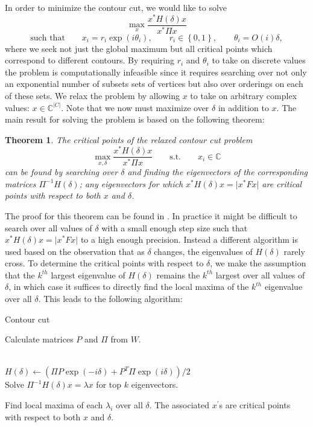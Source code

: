 \documentclass{SMBV12}
\newtheorem{theorem}{Theorem}[section]
\begin{document}
In order to minimize the contour cut, we would like to solve
\begin{equation}
\max_x \dfrac{x^*H(\delta)x}{x^* \Pi x} 
\end{equation}
\begin{equation*}
 \mbox{such that} \qquad x_i = r_i\exp(i\theta_i), \qquad r_i \in \left\lbrace 0, 1 \right\rbrace, \qquad \theta_i = O(i)\delta,
\end{equation*}
where we seek not just the global maximum but all critical points which correspond to different contours. By requiring $r_i$ and $\theta_i$ to take on discrete values the problem is computationally infeasible since it requires searching over not only an exponential number of subsets sets of vertices but also over orderings on each of these sets. We relax the problem by allowing $x$ to take on arbitrary complex values: $x \in \mathbb{C}^{\lvert C \rvert}$. Note that we now must maximize over $\delta$ in addition to $x$. The main result for solving the problem is based on the following theorem:
\begin{theorem}
\label{theorem:hermitian}
The critical points of the relaxed contour cut problem
\begin{equation}
\max_{x, \delta} \dfrac{x^*H(\delta)x}{x^* \Pi x} \qquad \mbox{s.t.} \qquad x_i \in \mathbb{C}
\label{eq:hermitian}
\end{equation}
can be found by searching over $\delta$ and finding the eigenvectors of the corresponding matrices $\Pi^{-1}H(\delta)$; any eigenvectors for which $x^*H(\delta)x = \lvert x^*Fx \rvert$ are critical points
with respect to both $x$ and $\delta$.
\end{theorem}
The proof for this theorem can be found in \cite{KenGalShi2011}. In practice it might be difficult to search over all values of $\delta$ with a small enough step size such that $x^*H(\delta)x = \lvert x^*Fx \rvert$ to a high enough precision. Instead a different algorithm is used based on the observation that as $\delta$ changes, the eigenvalues of $H(\delta)$ rarely cross. To determine the critical points with respect to $\delta$, we make the assumption that the $k^{th}$ largest eigenvalue of $H(\delta)$ remains the $k^{th}$ largest over all values of $\delta$, in which case it suffices to directly find the local maxima of the $k^{th}$ eigenvalue over all $\delta$. This leads to the following algorithm:

\begin{algorithm}
\caption{Contour cut}
Calculate matrices $P$ and $\Pi$ from $W$.
\begin{algorithmic}
\\
\qquad $H(\delta) \leftarrow (\Pi P \exp(-i\delta) + P^T \Pi \exp(i\delta))/2$\\
\qquad Solve $\Pi^{-1} H(\delta)x = \lambda x$ for top $k$ eigenvectors.
\EndFor
\end{algorithmic}
Find local maxima of each $\lambda_i$ over all $\delta$. The associated $x^\prime$s are critical points with respect to both $x$ and $\delta$.
\end{algorithm}
\end{document}
